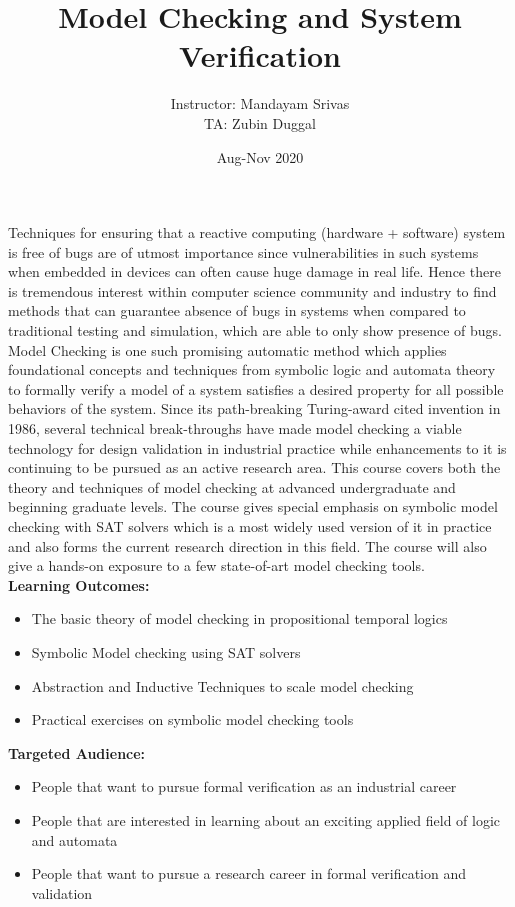 \documentclass{article}
\title{\textbf{Model Checking and System Verification}}
\author{Instructor: Mandayam Srivas \\
TA: Zubin Duggal}
\date{Aug-Nov 2020}
\begin{document}
\maketitle
\small{
\noindent
Techniques for ensuring that a reactive computing (hardware + software) system is free of bugs are of utmost importance since vulnerabilities in such systems when embedded in devices can often cause huge damage in real life.
Hence there is tremendous interest within computer science community and industry to find methods that can guarantee absence of bugs in systems when compared to traditional testing and simulation, which are able to only show presence of bugs.
Model Checking is one such promising automatic method which applies foundational concepts and techniques from symbolic logic and automata theory to formally verify a model of a system satisfies a desired property for all possible behaviors of the system.
Since its path-breaking Turing-award cited invention in 1986, several technical break-throughs have made model checking a viable technology for design validation in industrial practice while enhancements to it is continuing to be pursued as an active research area.
This course covers both the theory and techniques of model checking at advanced undergraduate and beginning graduate levels.
The course gives special emphasis on symbolic model checking with SAT solvers which is a most widely used version of it in practice and also forms the current research direction in this field.
The course will also give a hands-on exposure to a few state-of-art model checking tools. \\[0.25cm]
\noindent
\textbf{Learning Outcomes:}
\begin{itemize}
\item The basic theory of model checking in propositional temporal logics
\item Symbolic Model checking using SAT solvers
\item Abstraction and Inductive Techniques to scale model checking
\item Practical exercises on symbolic model checking tools
\end{itemize}
\noindent
\textbf{Targeted Audience:}
\begin{itemize}
\item People that want to pursue formal verification as an industrial career
\item People that are interested in learning about an exciting applied field of logic and automata
\item People that want to pursue a research career in formal verification and validation

\end{itemize}}
\end{document}
